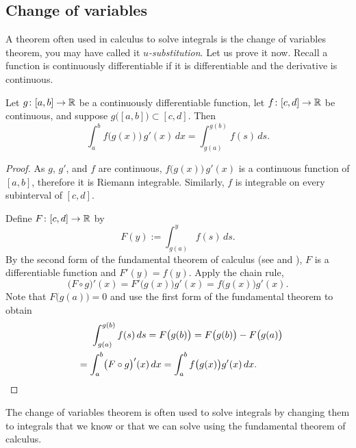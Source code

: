 \subsection{Change of variables}

A theorem often used in calculus to solve integrals is the change of
variables theorem, you may have called it \emph{$u$-substitution}.
Let us prove it now.  Recall 
a function is continuously differentiable if
it is differentiable and the derivative is continuous.

\begin{thm}
Let $g \colon [a,b] \to {\mathbb{R}}$ be a continuously differentiable function,
let $f \colon [c,d] \to {\mathbb{R}}$ be continuous, and suppose
$g\bigl([a,b]\bigr) \subset [c,d]$.  Then
\begin{equation*}
\int_a^b f\bigl(g(x)\bigr)\, g'(x)\, dx =
\int_{g(a)}^{g(b)} f(s)\, ds .
\end{equation*}
\end{thm}

\begin{proof}
As $g$, $g'$, and $f$ are continuous, $f\bigl(g(x)\bigr)\,g'(x)$
is a continuous function of $[a,b]$, therefore it is Riemann integrable.
Similarly, $f$ is integrable on every subinterval of $[c,d]$.

Define $F \colon [c,d] \to {\mathbb{R}}$ by
\begin{equation*}
F(y) := \int_{g(a)}^{y} f(s)\,ds .
\end{equation*}
By the second form of the fundamental
theorem of calculus
(see  and ),
$F$ is a differentiable function and $F'(y) = f(y)$.  Apply the chain
rule,
\begin{equation*}
\bigl( F \circ g \bigr)' (x) =
F'\bigl(g(x)\bigr) g'(x)
=
f\bigl(g(x)\bigr) g'(x) .
\end{equation*}
Note that $F\bigl(g(a)\bigr) = 0$ and
use the first form of the fundamental theorem
to obtain
\begin{multline*}
\qquad %
\int_{g(a)}^{g(b)} f(s)\,ds = F\bigl(g(b)\bigr) = F\bigl(g(b)\bigr)-F\bigl(g(a)\bigr)
\\
=
\int_a^b 
\bigl( F \circ g \bigr)' (x) \,dx
=
\int_a^b 
f\bigl(g(x)\bigr) g'(x)
\,dx .
\qquad %
\qedhere
\end{multline*}
\end{proof}

The change of variables theorem is often used to solve integrals by changing them
to integrals that we know or that we can solve using the fundamental theorem of
calculus.

